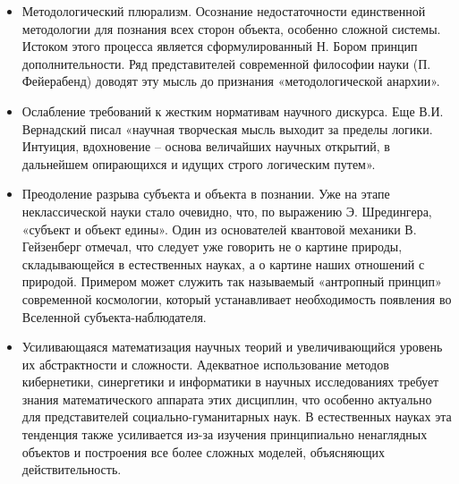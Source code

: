 \begin{itemize}
    \item Методологический плюрализм. Осознание недостаточности единственной методологии для познания всех сторон объекта, особенно сложной системы. Истоком этого процесса является сформулированный Н. Бором принцип дополнительности. Ряд представителей современной философии науки (П. Фейерабенд) доводят эту мысль до признания «методологической анархии».
    \item  Ослабление требований к жестким нормативам научного дискурса. Еще В.И. Вернадский писал «научная творческая мысль выходит за пределы логики. Интуиция, вдохновение – основа величайших научных открытий, в дальнейшем опирающихся и идущих строго логическим путем».
    \item Преодоление разрыва субъекта и объекта в познании. Уже на этапе неклассической науки стало очевидно, что, по выражению Э. Шредингера, «субъект и объект едины». Один из основателей квантовой механики В.  Гейзенберг отмечал, что следует уже говорить не о картине природы, складывающейся в естественных науках, а о картине наших отношений с природой. Примером может служить так называемый «антропный принцип» современной космологии, который устанавливает необходимость появления во Вселенной субъекта-наблюдателя.
    \item Усиливающаяся математизация научных теорий и увеличивающийся уровень их абстрактности и сложности. Адекватное использование методов кибернетики, синергетики и информатики в научных исследованиях требует знания математического аппарата этих дисциплин, что особенно актуально для представителей социально-гуманитарных наук. В естественных науках эта тенденция также усиливается из-за изучения принципиально ненаглядных объектов и построения все более сложных моделей, объясняющих действительность.
\end{itemize}
